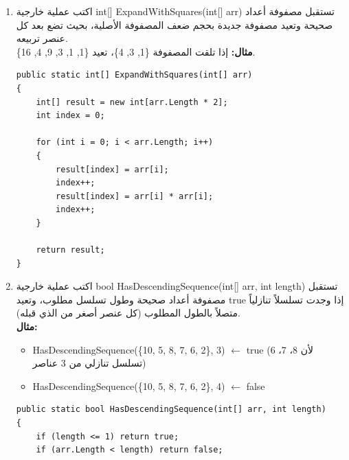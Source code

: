 \documentclass[14pt]{extarticle}
\begin{document}
\begin{enumerate}[resume, itemsep=2em]

    \item
    اكتب عملية خارجية \textenglish{int[] ExpandWithSquares(int[] arr)} تستقبل مصفوفة أعداد صحيحة وتعيد مصفوفة جديدة بحجم ضعف المصفوفة الأصلية، بحيث تضع بعد كل عنصر تربيعه.\\
    \textbf{مثال:} إذا تلقت المصفوفة \textenglish{\{1, 3, 4\}}، تعيد \textenglish{\{1, 1, 3, 9, 4, 16\}}.
    \ifwithsols
    \begin{boxSolution}
    \begin{english}
    \begin{verbatim}
public static int[] ExpandWithSquares(int[] arr)
{
    int[] result = new int[arr.Length * 2];
    int index = 0;

    for (int i = 0; i < arr.Length; i++)
    {
        result[index] = arr[i];
        index++;
        result[index] = arr[i] * arr[i];
        index++;
    }

    return result;
}
    \end{verbatim}
    \end{english}
    \end{boxSolution}
    \fi

    \item
    اكتب عملية خارجية \textenglish{bool HasDescendingSequence(int[] arr, int length)} تستقبل مصفوفة أعداد صحيحة وطول تسلسل مطلوب، وتعيد \textenglish{true} إذا وجدت تسلسلاً تنازلياً متصلاً بالطول المطلوب (كل عنصر أصغر من الذي قبله).\\
    \textbf{مثال:}
    \begin{itemize}
        \item \textenglish{HasDescendingSequence(\{10, 5, 8, 7, 6, 2\}, 3)} $\leftarrow$ \textenglish{true} (لأن 8، 7، 6 تسلسل تنازلي من 3 عناصر)
        \item \textenglish{HasDescendingSequence(\{10, 5, 8, 7, 6, 2\}, 4)} $\leftarrow$ \textenglish{false}
    \end{itemize}
    \ifwithsols
    \begin{boxSolution}
    \begin{english}
    \begin{verbatim}
public static bool HasDescendingSequence(int[] arr, int length)
{
    if (length <= 1) return true;
    if (arr.Length < length) return false;


\end{verbatim}
\end{english}
\end{boxSolution}
\end{enumerate}
\end{document}
